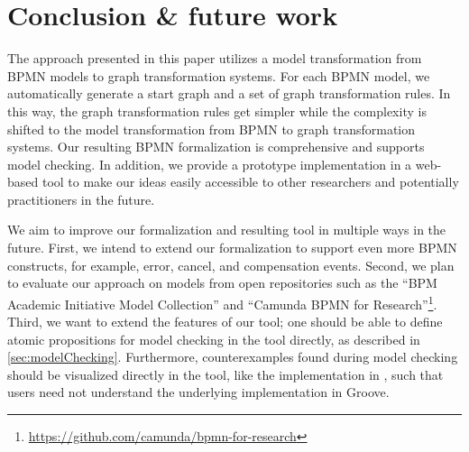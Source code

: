 \documentclass[submission, copyright, creativecommons]{eptcs}
\begin{document}
\section{Conclusion \& future work} \label{sec:conclusion}
The approach presented in this paper utilizes a model transformation from BPMN models to graph transformation systems. 
For each BPMN model, we automatically generate a start graph and a set of graph transformation rules.
In this way, the graph transformation rules get simpler while the complexity is shifted to the model transformation from BPMN to graph transformation systems.
Our resulting BPMN formalization is comprehensive and supports model checking.
In addition, we provide a prototype implementation in a web-based tool to make our ideas easily accessible to other researchers and potentially practitioners in the future.

We aim to improve our formalization and resulting tool in multiple ways in the future.
First, we intend to extend our formalization to support even more BPMN constructs, for example, error, cancel, and compensation events.
Second, we plan to evaluate our approach on models from open repositories such as the \enquote{BPM Academic Initiative Model Collection} \cite{weskeModelCollectionBusiness2020} and  \enquote{Camunda BPMN for
Research}\footnote{\url{https://github.com/camunda/bpmn-for-research}}.
Third, we want to extend the features of our tool;
one should be able to define atomic propositions for model checking in the tool directly, as described in \cref{sec:modelChecking}.
Furthermore, counterexamples found during model checking should be visualized directly in the tool, like the implementation in \cite{houhouFirstOrderLogicVerification2022}, such that users need not understand the underlying implementation in Groove.


\end{document}
